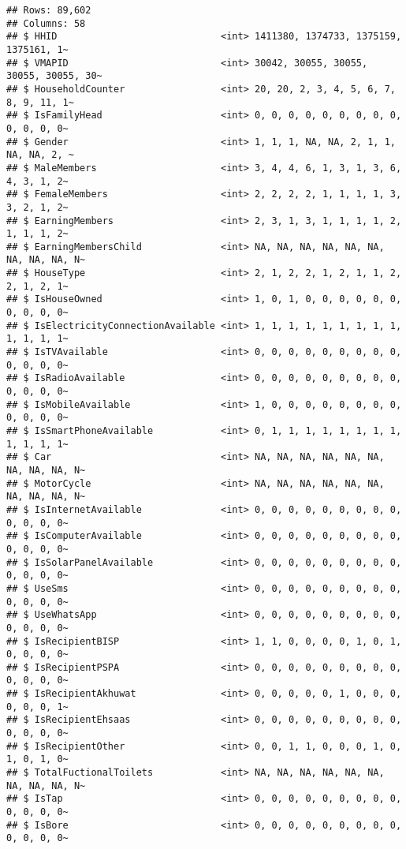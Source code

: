 \documentclass[
]{article}
\begin{document}
\begin{verbatim}
## Rows: 89,602
## Columns: 58
## $ HHID                             <int> 1411380, 1374733, 1375159, 1375161, 1~
## $ VMAPID                           <int> 30042, 30055, 30055, 30055, 30055, 30~
## $ HouseholdCounter                 <int> 20, 20, 2, 3, 4, 5, 6, 7, 8, 9, 11, 1~
## $ IsFamilyHead                     <int> 0, 0, 0, 0, 0, 0, 0, 0, 0, 0, 0, 0, 0~
## $ Gender                           <int> 1, 1, 1, NA, NA, 2, 1, 1, NA, NA, 2, ~
## $ MaleMembers                      <int> 3, 4, 4, 6, 1, 3, 1, 3, 6, 4, 3, 1, 2~
## $ FemaleMembers                    <int> 2, 2, 2, 2, 1, 1, 1, 1, 3, 3, 2, 1, 2~
## $ EarningMembers                   <int> 2, 3, 1, 3, 1, 1, 1, 1, 2, 1, 1, 1, 2~
## $ EarningMembersChild              <int> NA, NA, NA, NA, NA, NA, NA, NA, NA, N~
## $ HouseType                        <int> 2, 1, 2, 2, 1, 2, 1, 1, 2, 2, 1, 2, 1~
## $ IsHouseOwned                     <int> 1, 0, 1, 0, 0, 0, 0, 0, 0, 0, 0, 0, 0~
## $ IsElectricityConnectionAvailable <int> 1, 1, 1, 1, 1, 1, 1, 1, 1, 1, 1, 1, 1~
## $ IsTVAvailable                    <int> 0, 0, 0, 0, 0, 0, 0, 0, 0, 0, 0, 0, 0~
## $ IsRadioAvailable                 <int> 0, 0, 0, 0, 0, 0, 0, 0, 0, 0, 0, 0, 0~
## $ IsMobileAvailable                <int> 1, 0, 0, 0, 0, 0, 0, 0, 0, 0, 0, 0, 0~
## $ IsSmartPhoneAvailable            <int> 0, 1, 1, 1, 1, 1, 1, 1, 1, 1, 1, 1, 1~
## $ Car                              <int> NA, NA, NA, NA, NA, NA, NA, NA, NA, N~
## $ MotorCycle                       <int> NA, NA, NA, NA, NA, NA, NA, NA, NA, N~
## $ IsInternetAvailable              <int> 0, 0, 0, 0, 0, 0, 0, 0, 0, 0, 0, 0, 0~
## $ IsComputerAvailable              <int> 0, 0, 0, 0, 0, 0, 0, 0, 0, 0, 0, 0, 0~
## $ IsSolarPanelAvailable            <int> 0, 0, 0, 0, 0, 0, 0, 0, 0, 0, 0, 0, 0~
## $ UseSms                           <int> 0, 0, 0, 0, 0, 0, 0, 0, 0, 0, 0, 0, 0~
## $ UseWhatsApp                      <int> 0, 0, 0, 0, 0, 0, 0, 0, 0, 0, 0, 0, 0~
## $ IsRecipientBISP                  <int> 1, 1, 0, 0, 0, 0, 1, 0, 1, 0, 0, 0, 0~
## $ IsRecipientPSPA                  <int> 0, 0, 0, 0, 0, 0, 0, 0, 0, 0, 0, 0, 0~
## $ IsRecipientAkhuwat               <int> 0, 0, 0, 0, 0, 1, 0, 0, 0, 0, 0, 0, 1~
## $ IsRecipientEhsaas                <int> 0, 0, 0, 0, 0, 0, 0, 0, 0, 0, 0, 0, 0~
## $ IsRecipientOther                 <int> 0, 0, 1, 1, 0, 0, 0, 1, 0, 1, 0, 1, 0~
## $ TotalFuctionalToilets            <int> NA, NA, NA, NA, NA, NA, NA, NA, NA, N~
## $ IsTap                            <int> 0, 0, 0, 0, 0, 0, 0, 0, 0, 0, 0, 0, 0~
## $ IsBore                           <int> 0, 0, 0, 0, 0, 0, 0, 0, 0, 0, 0, 0, 0~

\end{verbatim}
\end{document}
